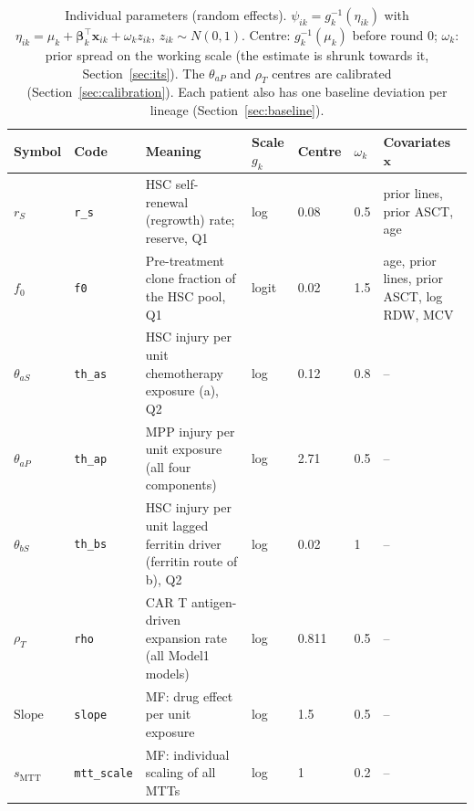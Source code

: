 \begin{table}[!htbp]
\centering
\footnotesize
\setlength{\tabcolsep}{3.5pt}
\caption{Individual parameters (random effects). $\psi_{ik}=g_k^{-1}(\eta_{ik})$ with $\eta_{ik}=\mu_k+\boldsymbol\beta_k^\top\mathbf{x}_{ik}+\omega_k z_{ik}$, $z_{ik}\sim N(0,1)$. Centre: $g_k^{-1}(\mu_k)$ before round 0; $\omega_k$: prior spread on the working scale (the estimate is shrunk towards it, Section~\ref{sec:its}). The $\theta_{aP}$ and $\rho_T$ centres are calibrated (Section~\ref{sec:calibration}). Each patient also has one baseline deviation per lineage (Section~\ref{sec:baseline}).}
\label{tab:re}
\begin{tabular}{ll>{\raggedright\arraybackslash}p{5.4cm}lll>{\raggedright\arraybackslash}p{3.2cm}}
\toprule
Symbol & Code & Meaning & Scale $g_k$ & Centre & $\omega_k$ & Covariates $\mathbf{x}$ \\
\midrule
$r_S$ & \texttt{r\_s} & HSC self-renewal (regrowth) rate; reserve, Q1 & log & 0.08 & 0.5 & prior lines, prior ASCT, age \\
$f_0$ & \texttt{f0} & Pre-treatment clone fraction of the HSC pool, Q1 & logit & 0.02 & 1.5 & age, prior lines, prior ASCT, log RDW, MCV \\
$\theta_{aS}$ & \texttt{th\_as} & HSC injury per unit chemotherapy exposure (a), Q2 & log & 0.12 & 0.8 & -- \\
$\theta_{aP}$ & \texttt{th\_ap} & MPP injury per unit exposure (all four components) & log & 2.71 & 0.5 & -- \\
$\theta_{bS}$ & \texttt{th\_bs} & HSC injury per unit lagged ferritin driver (ferritin route of b), Q2 & log & 0.02 & 1 & -- \\
$\rho_T$ & \texttt{rho} & CAR T antigen-driven expansion rate (all Model1 models) & log & 0.811 & 0.5 & -- \\
$\mathrm{Slope}$ & \texttt{slope} & MF: drug effect per unit exposure & log & 1.5 & 0.5 & -- \\
$s_{\mathrm{MTT}}$ & \texttt{mtt\_scale} & MF: individual scaling of all MTTs & log & 1 & 0.2 & -- \\
\bottomrule
\end{tabular}
\end{table}
